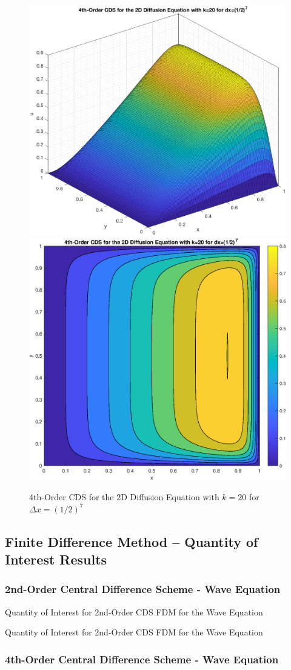 \documentclass[10pt]{article}		%
\numberwithin{equation}{section}
\begin{document}
\begin{figure}[H]
	\begin{center}
		\includegraphics[width = 0.36\linewidth]{surface_minus_order_4_k_20_dx_order_7}
		\includegraphics[width = 0.36\linewidth]{contour_minus_order_4_k_20_dx_order_7}
		\caption{4th-Order CDS for the 2D Diffusion Equation with $k = 20$ for $\Delta x = (1/2)^7$}
	\end{center}
\end{figure}

\newpage

\subsection{Finite Difference Method -- Quantity of Interest Results}

\subsubsection{2nd-Order Central Difference Scheme - Wave Equation}

\begin{table}[H]
	\flushleft
	\caption{Quantity of Interest for 2nd-Order CDS FDM for the Wave Equation}		
   
\end{table}

\begin{table}[H]
	\caption{Quantity of Interest for 2nd-Order CDS FDM for the Wave Equation}		
	
\end{table}

\subsubsection{4th-Order Central Difference Scheme - Wave Equation}
\end{document}
